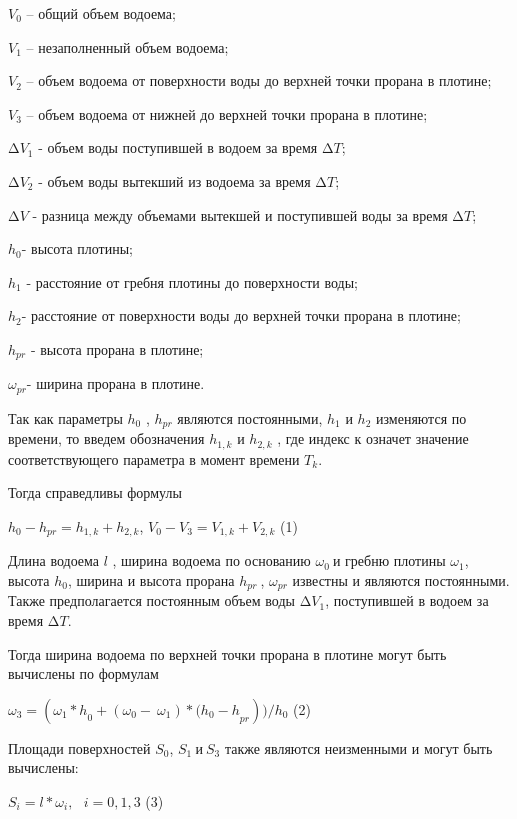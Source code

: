 \documentclass[
]{article}
\begin{document}
\(V_{0}\) -- общий объем водоема;

\(V_{1}\) -- незаполненный объем водоема;

\(V_{2}\) -- объем водоема от поверхности воды до верхней точки прорана
в плотине;

\(V_{3}\) -- объем водоема от нижней до верхней точки прорана в плотине;

\(\mathrm{\Delta}V_{1}\) - объем воды поступившей в водоем за время
\(\mathrm{\Delta}T\);

\(\mathrm{\Delta}V_{2}\) - объем воды вытекший из водоема за время
\(\mathrm{\Delta}T\);

\(\mathrm{\Delta}V\) - разница между объемами вытекшей и поступившей
воды за время \(\mathrm{\Delta}T\);

\(h_{0}\)- высота плотины;

\(h_{1}\) - расстояние от гребня плотины до поверхности воды;

\(h_{2}\)- расстояние от поверхности воды до верхней точки прорана в
плотине;

\(h_{pr}\) - высота прорана в плотине;

\(\omega_{pr}\)- ширина прорана в плотине.

Так как параметры \(h_{0}\) , \(h_{pr}\) являются постоянными, \(h_{1}\)
и \(h_{2}\) изменяются по времени, то введем обозначения \(h_{1,k}\) и
\(h_{2,k}\) , где индекс к означет значение соответствующего параметра в
момент времени \(T_{k}\).

Тогда справедливы формулы

\(h_{0} - h_{pr} = h_{1,k} + h_{2,k}\),
\(V_{0} - V_{3} = V_{1,k} + V_{2,k}\) (1)

Длина водоема \(l\) , ширина водоема по основанию \(\omega_{0}\ \)и
гребню плотины \(\omega_{1}\), высота \(h_{0}\), ширина и высота прорана
\(h_{pr}\ \), \(\omega_{pr}\) известны и являются постоянными. Также
предполагается постоянным объем воды \(\mathrm{\Delta}V_{1}\),
поступившей в водоем за время \(\mathrm{\Delta}T\).

Тогда ширина водоема по верхней точки прорана в плотине могут быть
вычислены по формулам

\(\omega_{3} = ({\omega_{1}*h}_{0} + \left( \omega_{0} - \ \omega_{1} \right)*{(h_{0} - h}_{pr}))/h_{0}\)
(2)

Площади поверхностей \(S_{0}\), \(S_{1}\ и\ S_{3}\) также являются
неизменными и могут быть вычислены:

\(S_{i} = l*\omega_{i},\ \ \ i = 0,1,3\) (3)
\end{document}
